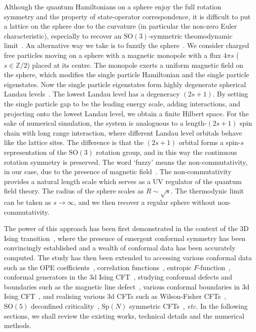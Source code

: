 \documentclass{timesjhep}
\begin{document}
Although the quantum Hamiltonians on a sphere enjoy the full rotation symmetry and the property of state-operator correspondence, it is difficult to put a lattice on the sphere due to the curvature (in particular the non-zero Euler characteristic), especially to recover an $\mathrm{SO}(3)$-symmetric theomodynamic limit~\cite{Brower2024Sphere}. An alternative way we take is to fuzzify the sphere~\cite{Madore1991Fuzzy}. We consider charged free particles moving on a sphere with a magnetic monopole with a flux $4\pi s$ ($s\in\mathbb{Z}/2$) placed at its centre. The monopole exerts a uniform magnetic field on the sphere, which modifies the single particle Hamiltonian and the single particle eigenstates. Now the single particle eigenstates form highly degenerate spherical Landau levels~\cite{Haldane1983LLL,Wu1976LLL,Greiter2011LLL,Hasebe2010LLL}. The lowest Landau level has a degeneracy $(2s+1)$. By setting the single particle gap to be the leading energy scale, adding interactions, and projecting onto the lowest Landau level, we obtain a finite Hilbert space. For the sake of numerical simulation, the system is analoguous to a length-$(2s+1)$ spin chain with long range interaction, where different Landau level orbitals behave like the lattice sites. The difference is that the $(2s+1)$ orbital forms a spin-$s$ representation of the $\mathrm{SO}(3)$ rotation group, and in this way the continuous rotation symmetry is preserved. The word `fuzzy' means the non-commutativity, in our case, due to the presence of magnetic field~\cite{Madore1991Fuzzy,Hasebe2010LLL}. The non-commutativity provides a natural length scale which serves as a UV regulator of the quantum field theory. The radius of the sphere scales as $R\sim\sqrt s$. The thermodynic limit can be taken as $s\to\infty$, and we then recover a regular sphere without non-commutativity. 

The power of this approach has been first demonstrated in the context of the 3D Ising transition~\cite{Zhu2022}, where the presence of emergent conformal symmetry has been convincingly established and a wealth of conformal data has been accurately computed. The study has then been extended to accessing various conformal data such as the OPE coefficients~\cite{Hu2023Mar}, correlation functions~\cite{Han2023Jun}, entropic $F$-function~\cite{Hu2024}, conformal generators in the 3d Ising CFT~\cite{Fardelli2024,Fan2024}, studying conformal defects and boundaries such as the magnetic line defect~\cite{Hu2023Aug,Zhou2024Jan}, various conformal boundaries in 3d Ising CFT~\cite{Zhou2024Jul,Dedushenko2024}, and realising various 3d CFTs such as Wilson-Fisher CFTs~\cite{Han2023Dec}, $\mathrm{SO}(5)$ deconfined criticality~\cite{Zhou2023}, $\mathrm{Sp}(N)$ symmetric CFTs~\cite{Zhou2024Oct}, \textit{etc.} In the following sections, we shall review the existing works, technical details and the numerical methods. 
\end{document}
